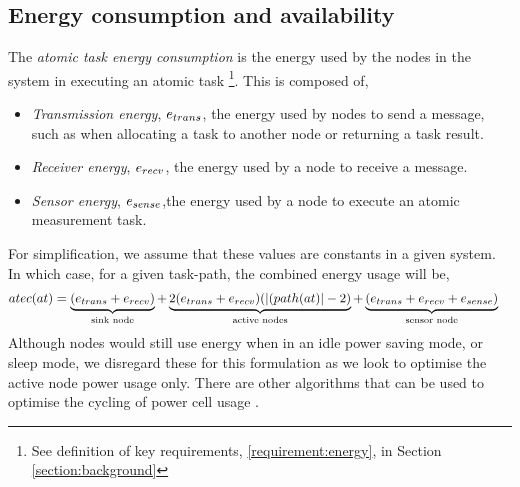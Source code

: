\subsection{Energy consumption and availability}
\label{section:energy_consumption}

The \textit{atomic task energy consumption} is the energy used by the nodes in the system in executing an atomic task \footnote{See definition of key requirements, \ref{requirement:energy}, in Section \ref{section:background}}. This is composed of,
 \begin{itemize}
 	\item \textit{Transmission energy}, $e_{trans}$, the energy used by nodes to  send a message, such as when allocating a task to another node or returning a task result. 
 	\item \textit{Receiver energy}, $e_{recv}$, the energy used by a node to receive a message. 
 	 \item \textit{Sensor energy}, $e_{sense}$,the energy used by a node to execute an atomic measurement task.
 \end{itemize}
For simplification, we assume that these values are constants in a given system. In which case, for a given task-path, the combined energy usage will be,
\begin{align}
\functionAtomicTaskEnergyConsumptionSignature{}{} 
&= 
\underbrace{(\varTransmissionEnergy{}{} + \varReceiverEnergy{}{})}_{\text{sink node}}
+ \underbrace{
	2 (\varTransmissionEnergy{}{} + \varReceiverEnergy{}{})
 	(\funcSize{(\functionTaskArc{}{}}{} -2)
}_{\text{active nodes}}
+ \underbrace{
	 (
	 	\varTransmissionEnergy{}{}
	 	+ \varReceiverEnergy{}{}
	 	+ \varSensorEnergy{}{}
	 )
 }_{\text{sensor node}}  
\end{align}
Although nodes would still use energy when in an idle power saving mode, or sleep mode, we disregard these for this formulation as we look to optimise the active node power usage only. There are other algorithms that can be used to optimise the cycling of power cell usage \citep{Escolar2014}.

\newcommand{\formalAgentEnergyAvailable}[2]{
	\functionFormal{fae}
	{\setAgents{}{}}
	{\setRealNumbersUnit{}{}}
}
\newcommand{\functionAgentEnergyAvailable}[2]{
	\functionSignature{fae_{\varTime{}{}}}
	{\varAgent{}{}}
}
\newcommand{\functionEnergyVariability}[2]{
	\ifx \\#1\\
	\functionSignature{rev_{\varTime{}{}}}
	{\setAgents{}{}}
	\else
	\functionSignature{rev_{\varTime{}{}}}{#1}
	\fi
}

